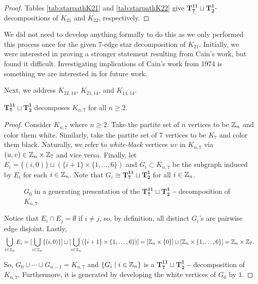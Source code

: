 \begin{proof}
     Tables \ref{tab:starpathK21} and \ref{tab:starpathK22} give $\mathbf{T_{7}^{11}}\sqcup\mathbf{T_{2}^{1}}$-decompositions of $K_{21}$ and $K_{22}$, respectively.%

\end{proof}
We did not need to develop anything formally to do this as we only performed this process once for the given $7$-edge star decomposition of $K_{21}$. Initially, we were interested in proving a stronger statement resulting from Cain's work, but found it difficult. Investigating implications of Cain's work \cite{Cain1974} from 1974 is something we are interested in for future work.

Next, we address $K_{22,14}$, $K_{21,14}$, and $K_{14,14}$. 
\newpage
\begin{thm} \label{thm:K_n,7}
    $\mathbf{T_{7}^{11}}\sqcup\mathbf{T_{2}^{1}}$ decomposes $K_{n,7}$ for all $n\geq 2$.
\end{thm}

\begin{proof}
    Consider $K_{n,7}$ where $n\geq 2$. Take the partite set of $n$ vertices to be $\mathbb{Z}_{n}$ and color them white. Similarly, take the partite set of $7$ vertices to be $K_{7}$ and color them black. Naturally, we refer to \textit{white-black} vertices $uv$ in $K_{n,7}$ via $(u,v)\in \mathbb{Z}_{n}\times\mathbb{Z}_{7}$ and vice versa. Finally, let $E_{i}=\{(i,0)\}\sqcup (\{i+1\}\times \{1,\hdots,6\})$ and $G_{i}\subset K_{n,7}$ be the subgraph induced by $E_{i}$ for each $i\in \mathbb{Z}_{n}$. Note that $G_{i}\cong \mathbf{T_{7}^{11}}\sqcup\mathbf{T_{2}^{1}}$ for all $i\in \mathbb{Z}_{n}$.

    \begin{figure}[H]
        \centering
        
        \caption{$G_{0}$ in a generating presentation of the $\mathbf{T_{7}^{11}}\sqcup\mathbf{T_{2}^{1}}-$decomposition of $K_{n,7}$.}
        \label{fig:starpathbip}
    \end{figure}

    \noindent Notice that $E_{i}\cap E_{j}=\emptyset$ if $i\neq j$, so, by definition, all distinct $G_{i}$'s are pairwise edge disjoint. Lastly,
    $$\bigcup_{i\in \mathbb{Z}_{n}} E_{i}=[\bigcup_{i\in \mathbb{Z}_{n}} \{(i,0)\}]\sqcup [\bigcup_{i\in \mathbb{Z}_{n}} (\{i+1\}\times \{1,\hdots, 6\})]=[\mathbb{Z}_{n}\times \{0\}]\sqcup [\mathbb{Z}_{n}\times \{1,\hdots, 6\}]=\mathbb{Z}_{n}\times \mathbb{Z}_{7}.$$
    
    \noindent So, $G_{0}\cup \cdots \cup G_{n-1}=K_{n,7}$ and $\{G_{i}\mid i\in \mathbb{Z}_{n}\}$ is a $\mathbf{T_{7}^{11}}\sqcup\mathbf{T_{2}^{1}}-$decomposition of $K_{n,7}$. Furthermore, it is generated by developing the white vertices of $G_{0}$ by $1$.

\end{proof}

